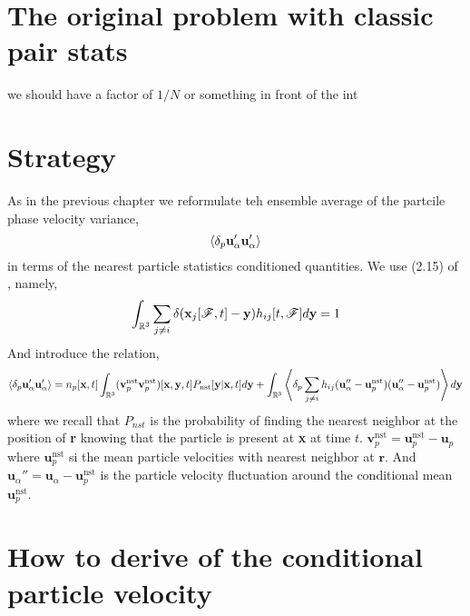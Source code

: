 \section{The original problem with classic pair stats}

we should have a factor of $1/N$ or something in front of the int 


\section{Strategy}

As in the previous chapter we reformulate teh ensemble average of the partcile phase velocity variance, 
\begin{equation}
    \left<\delta_p \textbf{u}_\alpha'\textbf{u}_\alpha'\right>
\end{equation}
in terms of the nearest particle statistics conditioned quantities. 
We use (2.15) of \citet{zhang2021ensemble}, namely, 
\begin{equation}
    \int_{\mathbb{R}^3}
    \sum_{j\neq i}
    \delta(\textbf{x}_j[\mathscr{F},t] - \textbf{y}) h_{ij}[t,\mathscr{F}] d\textbf{y}
    = 1
\end{equation}
And introduce the relation, 
\begin{equation}
    \left<\delta_p \textbf{u}_\alpha'\textbf{u}_\alpha'\right>
    = 
    n_p[\textbf{x},t]
    \int_{\mathbb{R}^3}
    (\textbf{v}^\text{nst}_p
    \textbf{v}^\text{nst}_p)[\textbf{x},\textbf{y},t]
    P_\text{nst}[\textbf{y}|\textbf{x},t]
    d\textbf{y}
    + 
    \int_{\mathbb{R}^3}
    \left<\delta_p 
        \sum_{j\neq i }
        h_{ij} 
        (\textbf{u}_\alpha'' - \textbf{u}^\text{nst}_p)
        (\textbf{u}_\alpha'' - \textbf{u}^\text{nst}_p)
    \right>d \textbf{y}
\end{equation}
where we recall that $P_{nst}$ is the probability of finding the nearest neighbor at the position of \textbf{r} knowing that the particle is present at \textbf{x} at time $t$. 
$\textbf{v}^\text{nst}_p = \textbf{u}_p^\text{nst} - \textbf{u}_p$ where $\textbf{u}_p^\text{nst}$ si the mean particle velocities with nearest neighbor at $\textbf{r}$. 
And $\textbf{u}_\alpha'' = \textbf{u}_\alpha - \textbf{u}^\text{nst}_p$ is the particle velocity fluctuation around the conditional mean $\textbf{u}^\text{nst}_p$. 


\section{How to derive of the conditional particle velocity}

